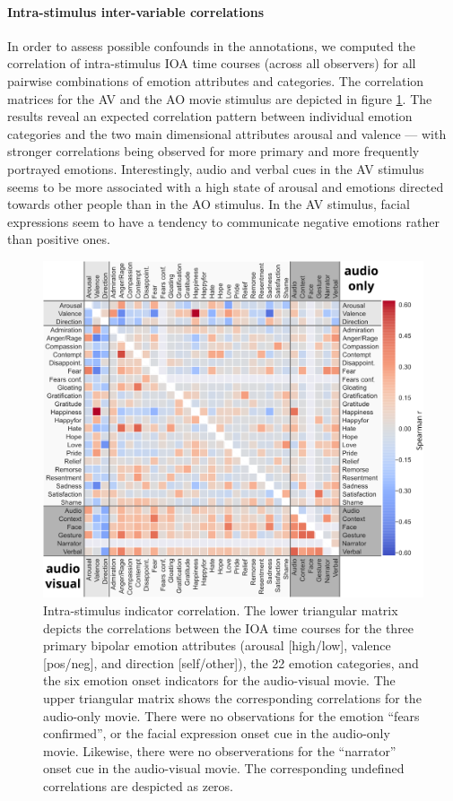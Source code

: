 \documentclass[10pt,a4paper,twocolumn]{article}
\begin{document}
\paragraph{Intra-stimulus inter-variable correlations}

In order to assess possible confounds in the annotations, we computed the
correlation of intra-stimulus IOA time courses (across all observers) for all
pairwise combinations of emotion attributes and categories. The correlation
matrices for the AV and the AO movie stimulus are depicted in figure
\ref{fig:intrastimcorrelation}. The results reveal an expected correlation
pattern between individual emotion categories and the two main dimensional
attributes arousal and valence --- with stronger correlations being observed for
more primary and more frequently portrayed emotions. Interestingly, audio and
verbal cues in the AV stimulus seems to be more associated with a high state of
arousal and emotions directed towards other people than in the AO stimulus. In
the AV stimulus, facial expressions seem to have a tendency to communicate
negative emotions rather than positive ones.


\begin{figure}
  \centering
  \includegraphics[width=\linewidth]{figures/bigcorr}
  \caption{Intra-stimulus indicator correlation. The lower triangular matrix
    depicts the correlations between the IOA time courses for
    the three primary bipolar emotion attributes (arousal [high/low], valence [pos/neg], and direction [self/other]), the
    22 emotion categories, and the six emotion onset indicators for the audio-visual
    movie. The upper triangular matrix shows the corresponding correlations for the
    audio-only movie. There were no observations for the emotion ``fears confirmed'', or the facial expression onset cue in the audio-only movie. Likewise, there were no observerations for the ``narrator'' onset cue in the audio-visual movie. The corresponding undefined correlations are despicted as zeros.
 }
  \label{fig:intrastimcorrelation}
\end{figure}
\end{document}
